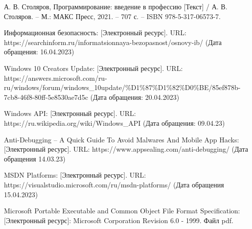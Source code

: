 

\begin{thebibliography}{0}

   А. В. Столяров, Программирование: введение в
  профессию [Текст] / А. В. Столяров. -- М.: МАКС Пресс, 2021. -- 707 с. -- ISBN
  978-5-317-06573-7.

   Информационная безопасность: [Электронный ресурс]. URL:
  https://searchinform.ru/informatsionnaya-bezopasnost/osnovy-ib/ (Дата
  обращения: 16.04.2023) 

   Windows 10 Creators Update: [Электронный ресурс]. URL:
  https://answers.microsoft.com/ru-ru/windows/forum/windows\_10update/\%D1\%87\%D1\%82\%D0\%BE/85ef878b-7cb8-46f8-80ff-5e8530ae7d5c
  (Дата обращения: 20.04.2023)

   Windows API: [Электронный ресурс]. URL:
  https://ru.wikipedia.org/wiki/Windows\_API (Дата обращения: 09.04.23) 

   Anti-Debugging – A Quick Guide To Avoid Malwares And
  Mobile App Hacks: [Электронный ресурс]. URL:
  https://www.appsealing.com/anti-debugging/ (Дата обращения 14.03.23)

   MSDN Platforms: [Электронный ресурс]. URL:
  https://visualstudio.microsoft.com/ru/msdn-platforms/ (Дата обращения
  15.04.2023)

   Microsoft Portable Executable and Common Object File Format
  Specification: [Электронный ресурс]: Microsoft Corporation Revision 6.0 -
  1999. Файл pdf.

\end{thebibliography}
